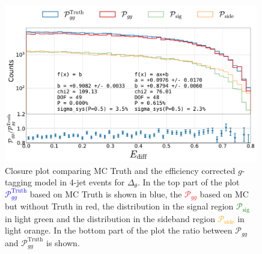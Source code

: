 \begin{figure}
  \centerfloat
  \includegraphics[width=0.99\textwidth, trim=10 0 20 5, clip, page=4]{figures/quarks/gtag-closure_test-down_sample=1.00-ML_vars=vertex-selection=b-ejet_min=4-n_iter_RS_lgb=99-n_iter_RS_xgb=9-cdot_cut=0.90-version=19-njet=4.pdf}
  \caption[Closure Plot Comparing MC Truth and the Efficiency Corrected $g$-Tagging Model in 4-Jet Events for $\Delta_\theta$]
          {Closure plot comparing MC Truth and the efficiency corrected $g$-tagging model in 4-jet events for $\Delta_\theta$. In the top part of the plot \textcolor{blue}{$\mathcal{P}_{gg}^\mathrm{Truth}$} based on MC Truth is shown in blue, the \textcolor{red}{$\mathcal{P}_{gg}$} based on MC but without Truth in red, the distribution in the signal region \textcolor{green}{$\mathcal{P}_{\mathrm{sig}}$} in light green and the distribution in the sideband region \textcolor{orange}{$\mathcal{P}_{\mathrm{side}}$} in light orange. In the bottom part of the plot the ratio between $\mathcal{P}_{gg}$ and $\mathcal{P}_{gg}^\mathrm{Truth}$  is shown. } 
  \label{fig:q:closure_delta_theta}
\end{figure}
